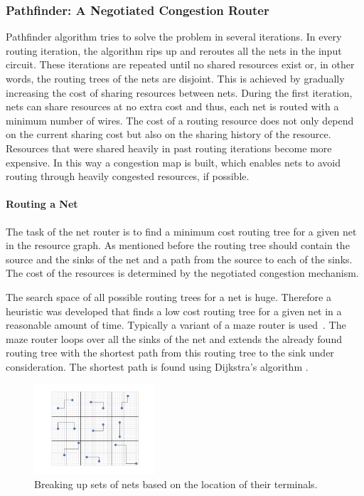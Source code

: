 \documentclass[a4paper,oneside,12pt]{article}
\begin{document}
\subsubsection{Pathfinder: A Negotiated Congestion Router}
\label{sec:pathfinder}
Pathfinder algorithm \cite{pathfinder} tries to solve the problem in several iterations. In every routing iteration, the algorithm rips up and reroutes all the nets in the input circuit. These iterations are repeated until no shared resources exist \cite{nair1987asyetfgw} or, in other words, the routing trees of the nets are disjoint. This is achieved by gradually increasing the cost of sharing resources between nets. During the first iteration, nets can share resources at no extra cost and thus, each net is routed with a minimum number of wires. The cost of a routing resource does not only depend on the current sharing cost but also on the sharing history of the resource. Resources that were shared heavily in past routing iterations become more expensive. In this way a congestion map is built, which enables nets to avoid routing through heavily congested resources, if possible.

\paragraph{Routing a Net}
The task of the net router is to find a minimum cost routing tree for a given net in the resource graph. As mentioned before the routing tree should contain the source and the sinks of the net and a path from the source to each of the sinks. The cost of the resources is determined by the negotiated congestion mechanism.

The search space of all possible routing trees for a net is huge. Therefore a heuristic was developed that finds a low cost routing tree for a given net in a reasonable amount of time. Typically a variant of a maze router is used~\cite{lee1961aafpcaia}. The maze router loops over all the sinks of the net and extends the already found routing tree with the shortest path from this routing tree to the sink under consideration. The shortest path is found using Dijkstra's algorithm \cite{dijkstra1959anotpicwg}.

\begin{figure}[ht]
\centering
\includegraphics[width = 0.4\textwidth,trim = 0mm 0mm 0mm 0mm, clip]{parallellisatie}
\caption{Breaking up sets of nets based on the location of their terminals.}
\label{geopara}
\end{figure}
\end{document}
